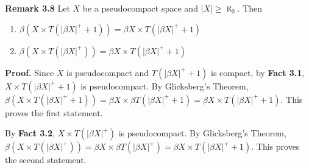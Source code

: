 \documentclass{article}
\begin{document}
\textbf{Remark 3.8} Let $X$ be a pseudocompact space and $|X|\geq \aleph_0.$ Then 


\begin{enumerate}
	\item $\beta(X\times T(|\beta X|^+ +1))=\beta X\times T(|\beta X|^+ +1)$
	\item $\beta(X\times T(|\beta X|^+))=\beta X\times T(|\beta X|^+ +1)$
	
\end{enumerate}


\vskip 20pt


\textbf{Proof.} Since $X$ is pseudocompact and  $T(|\beta X|^+ +1)$ is compact, by \textbf{Fact 3.1}, $X\times T(|\beta X|^+ +1)$ is pseudocompact. By Glicksberg's Theorem, $\beta(X\times T(|\beta X|^+ +1))=\beta X\times \beta T(|\beta X|^+ +1)=\beta X\times T(|\beta X|^+ +1).$ This proves the first statement.
\vskip 15pt

By \textbf{Fact 3.2}, $X\times T(|\beta X|^+)$ is pseudocompact. By Glicksberg's Theorem, $\beta(X\times T(|\beta X|^+))=\beta X\times \beta T(|\beta X|^+)=\beta X\times T(|\beta X|^+ +1)$. This proves the second statement.
\end{document}
